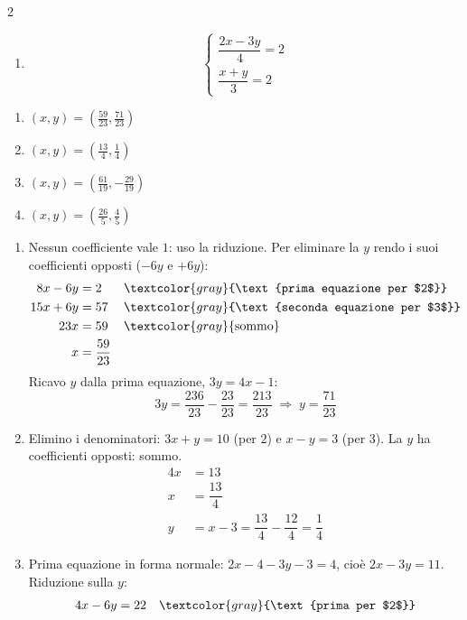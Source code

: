 \begin{question}[ID=1.4, subtitle={Sistemi lineari con parametro numerico e coefficienti frazionari}, difficulty=difficile, tags={sistemi, equazioni lineari}]
\begin{multicols}{2}
\begin{enumerate}[leftmargin=3.2cm]
    \item
    \[
    \begin{cases}
    \dfrac{2x-3y}{4}=2\\
    \dfrac{x+y}{3}=2
    \end{cases}
    \]
\end{enumerate}
\end{multicols}
\begin{solution}
\begin{enumerate}
    \item $(x,y)=\left(\tfrac{59}{23},\tfrac{71}{23}\right)$
    \item $(x,y)=\left(\tfrac{13}{4},\tfrac14\right)$
    \item $(x,y)=\left(\tfrac{61}{19},-\tfrac{29}{19}\right)$
    \item $(x,y)=\left(\tfrac{26}{5},\tfrac45\right)$
\end{enumerate}
\end{solution}
\begin{explanation}
\begin{enumerate}
    \item Nessun coefficiente vale $1$: uso la riduzione. Per eliminare la $y$ rendo i suoi coefficienti opposti ($-6y$ e $+6y$):
    \[\begin{aligned}
    8x-6y &= 2 && \textcolor{gray}{\text{prima equazione per $2$}}\\
    15x+6y &= 57 && \textcolor{gray}{\text{seconda equazione per $3$}}\\
    23x &= 59 && \textcolor{gray}{\text{sommo}}\\
    x &= \dfrac{59}{23}
    \end{aligned}\]
    Ricavo $y$ dalla prima equazione, $3y=4x-1$:
    \[ 3y=\dfrac{236}{23}-\dfrac{23}{23}=\dfrac{213}{23} \;\Rightarrow\; y=\dfrac{71}{23} \]
    \item Elimino i denominatori: $3x+y=10$ (per $2$) e $x-y=3$ (per $3$). La $y$ ha coefficienti opposti: sommo.
    \[\begin{aligned}
    4x &= 13\\
    x &= \dfrac{13}{4}\\
    y &= x-3=\dfrac{13}{4}-\dfrac{12}{4}=\dfrac14
    \end{aligned}\]
    \item Prima equazione in forma normale: $2x-4-3y-3=4$, cioè $2x-3y=11$. Riduzione sulla $y$:
    \[\begin{aligned}
    4x-6y &= 22 && \textcolor{gray}{\text{prima per $2$}}\\

\end{aligned}\]
\end{enumerate}
\end{explanation}
\end{question}
